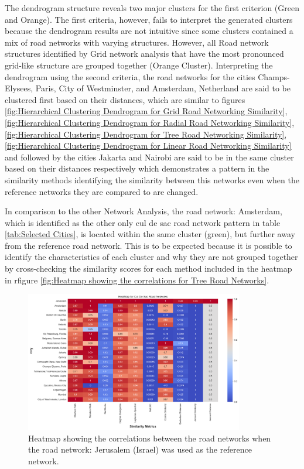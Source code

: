 The dendrogram structure reveals two major clusters for the first criterion (Green and Orange). The first criteria, however, fails to interpret the generated clusters because the dendrogram results are not intuitive since some clusters contained a mix of road networks with varying structures. However, all Road network structures identified by Grid network analysis that have the most pronounced grid-like structure are grouped together (Orange Cluster). Interpreting the dendrogram using the second criteria, the road networks for the cities Champs-Elysees, Paris, City of Westminster, and Amsterdam, Netherland are said to be clustered first based on their distances, which are similar to figures \ref{fig:Hierarchical Clustering Dendrogram for Grid Road Networking Similarity}, \ref{fig:Hierarchical Clustering Dendrogram for Radial Road Networking Similarity}, \ref{fig:Hierarchical Clustering Dendrogram for Tree Road Networking Similarity}, \ref{fig:Hierarchical Clustering Dendrogram for Linear Road Networking Similarity} and  followed by the cities Jakarta and Nairobi are said to be in the same cluster based on their distances  respectively which demonstrates a pattern in the similarity methods identifying the similarity between this networks even when the reference networks they are compared to are changed.

In comparison to the other Network Analysis, the road network: Amsterdam, which is identified as the other only cul de sac road network pattern in table  \ref{tab:Selected Cities}, is located within the same cluster (green), but further away from the reference road network. This is to be expected because it is possible to identify the characteristics of each cluster and why they are not grouped together by cross-checking the similarity scores for each method included in the heatmap in rfigure \ref{fig:Heatmap showing the correlations for Tree Road Networks}.


\begin{figure}[!ht]
\centering
\includegraphics[width=0.85\textwidth,center]{picture/Cul De Sac/culdesacheatmap.png}
\caption[Heatmap showing the correlations for Cul De Sac Road Networks]{Heatmap showing the correlations between the road networks when the road network: Jerusalem (Israel) was used as the reference network.}
\label{fig:Heatmap showing the correlations for Cul De Sac Road Networks}
\end{figure}

